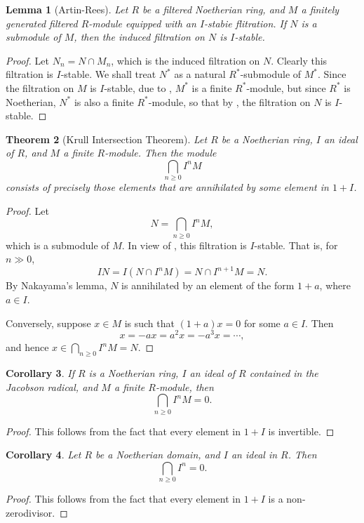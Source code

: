 \documentclass[11pt]{article}
\theoremstyle{thmstyle}
\newtheorem{theorem}{Theorem}[section]
\newtheorem{lemma}[theorem]{Lemma}
\theoremstyle{defstyle}
\newtheorem{corollary}[theorem]{Corollary}
\renewcommand{\ge}{\geqslant}
\begin{document}
\begin{lemma}[Artin-Rees]
    Let $R$ be a filtered Noetherian ring, and $M$ a finitely generated filtered $R$-module equipped with an $I$-stabie flitration. If $N$ is a submodule of $M$, then the induced filtration on $N$ is $I$-stable.
\end{lemma}
\begin{proof}
    Let $N_n = N\cap M_n$, which is the induced filtration on $N$. Clearly this filtration is $I$-stable. We shall treat $N^\ast$ as a natural $R^\ast$-submodule of $M^\ast$. Since the filtration on $M$ is $I$-stable, due to , $M^\ast$ is a finite $R^\ast$-module, but since $R^\ast$ is Noetherian, $N^\ast$ is also a finite $R^\ast$-module, so that by , the filtration on $N$ is $I$-stable.
\end{proof}

\begin{theorem}[Krull Intersection Theorem]
    Let $R$ be a Noetherian ring, $I$ an ideal of $R$, and $M$ a finite $R$-module. Then the module 
    \begin{equation*}
        \bigcap_{n\ge 0} I^n M
    \end{equation*}
    consists of precisely those elements that are annihilated by some element in $1 + I$.
\end{theorem}
\begin{proof}
    Let 
    \begin{equation*}
        N = \bigcap_{n\ge 0} I^n M,
    \end{equation*}
    which is a submodule of $M$. In view of , this filtration is $I$-stable. That is, for $n\gg 0$, 
    \begin{equation*}
        IN = I\left(N\cap I^n M\right) = N\cap I^{n + 1} M = N.
    \end{equation*}
    By Nakayama's lemma, $N$ is annihilated by an element of the form $1 + a$, where $a\in I$.

    Conversely, suppose $x\in M$ is such that $(1 + a)x = 0$ for some $a\in I$. Then 
    \begin{equation*}
        x = -ax = a^2 x = -a^3 x = \cdots,
    \end{equation*}
    and hence $x\in\bigcap_{n\ge 0} I^n M = N$.
\end{proof}

\begin{corollary}
    If $R$ is a Noetherian ring, $I$ an ideal of $R$ contained in the Jacobson radical, and $M$ a finite $R$-module, then 
    \begin{equation*}
        \bigcap_{n\ge 0} I^n M = 0.
    \end{equation*}
\end{corollary}
\begin{proof}
    This follows from the fact that every element in $1 + I$ is invertible.
\end{proof}

\begin{corollary}
    Let $R$ be a Noetherian domain, and $I$ an ideal in $R$. Then 
    \begin{equation*}
        \bigcap_{n\ge 0} I^n = 0.
    \end{equation*}
\end{corollary}
\begin{proof}
    This follows from the fact that every element in $1 + I$ is a non-zerodivisor.
\end{proof}
\end{document}
